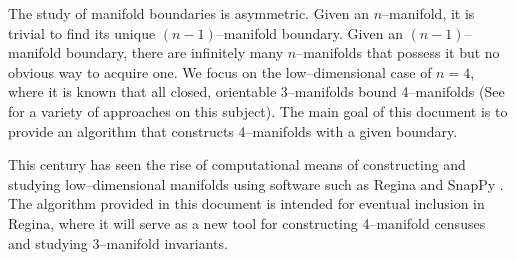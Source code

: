 \label{chapter:introduction}






The study of manifold boundaries is asymmetric.
Given an $n$--manifold, it is trivial to find its unique $(n-1)$--manifold boundary.
Given an $(n-1)$--manifold boundary, there are infinitely many $n$--manifolds that possess it but no obvious way to acquire one.
We focus on the low--dimensional case of $n=4$, where it is known that all closed, orientable 3--manifolds bound 4--manifolds (See \cite{wbr61, Rourke85, Thom} for a variety of approaches on this subject).
The main goal of this document is to provide an algorithm that constructs 4--manifolds with a given boundary.

This century has seen the rise of computational means of constructing and studying low--dimensional manifolds using software such as Regina \cite{regina} and SnapPy \cite{culler2017snappy}.
The algorithm provided in this document is intended for eventual inclusion in Regina, where it will serve as a new tool for constructing 4--manifold censuses and studying 3--manifold invariants.

